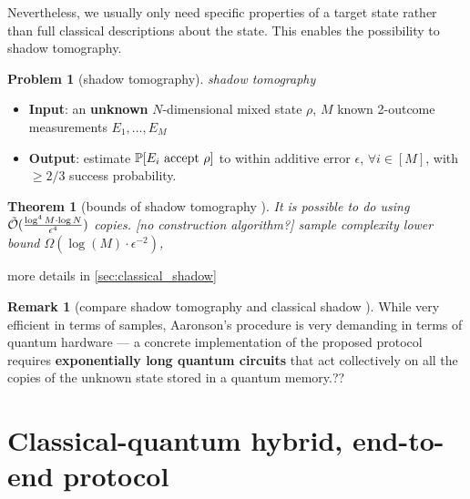 \documentclass[
10pt,
aps,
pra,
linenumbers,
floatfix,
]{revtex4-2}
\theoremstyle{plain}
\newtheorem{theorem}{Theorem}
\theoremstyle{definition}
\newtheorem{remark}{Remark}
\newtheorem{problem}{Problem}
\newcommand{\dm}{\rho}
\begin{document}
Nevertheless, we usually only need specific properties of a target state rather than full classical descriptions about the state.
This enables the possibility to shadow tomography.
\begin{problem}[shadow tomography]\label{prm:shadow_tomography}
	\emph{shadow tomography}
	\begin{itemize}
		\item \textbf{Input}: an \textbf{unknown} $N$-dimensional mixed state $\rho$, $M$ known 2-outcome measurements $E_1,\dots,E_M$
		\item \textbf{Output}: estimate $\probability[E_i \text{ accept } \dm]$ to within additive error $\epsilon$, $\forall i\in [M]$, with $\ge 2/3$ success probability.	
	\end{itemize}
\end{problem}
\begin{theorem}[bounds of shadow tomography \cite{aaronsonShadowTomographyQuantum2018}]\label{thm:shadow_tomography}
	It is possible to do  using $\tilde{\mathcal{O}}(\frac{\log^4 M\cdot \log N}{\epsilon^4})$ copies. [no construction algorithm?]
	sample complexity lower bound $\Omega(\log (M) \cdot \epsilon^{-2})$, 
\end{theorem}
more details in \cref{sec:classical_shadow}
\begin{remark}[compare shadow tomography and classical shadow \cite{huangPredictingManyProperties2020}]
	While very efficient in terms of samples, Aaronson's procedure is very demanding in terms of quantum hardware — a concrete implementation of the proposed protocol requires \textbf{exponentially long quantum circuits} that act collectively on all the copies of the unknown state stored in a quantum memory.??
\end{remark}

\section{Classical-quantum hybrid, end-to-end protocol}
\end{document}
